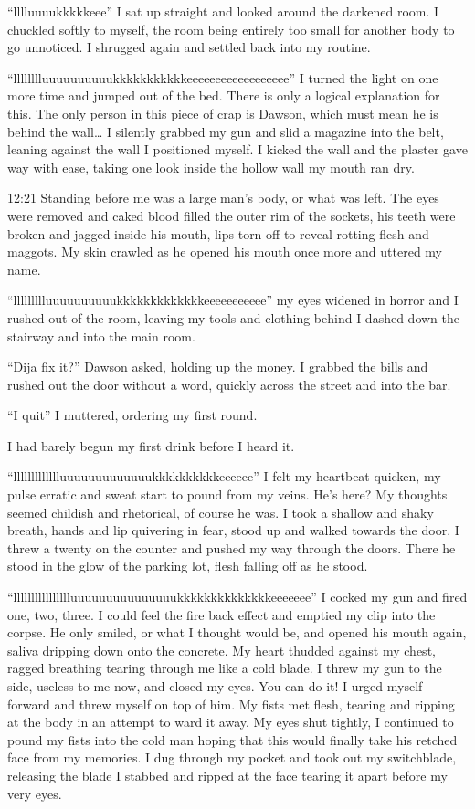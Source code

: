 ``lllluuuukkkkkeee'' I sat up straight and looked around
the darkened room. I chuckled softly to myself, the room being
entirely too small for another body to go unnoticed. I shrugged
again and settled back into my routine.

``lllllllluuuuuuuuuukkkkkkkkkkkeeeeeeeeeeeeeeeeee'' I
turned the light on one more time and jumped out of the bed. There
is only a logical explanation for this. The only person in this
piece of crap is Dawson, which must mean he is behind the wall{\ldots} I
silently grabbed my gun and slid a magazine into the belt, leaning
against the wall I positioned myself. I kicked the wall and the
plaster gave way with ease, taking one look inside the hollow wall
my mouth ran dry.

12:21 Standing before me was a large man's body, or what was left.
The eyes were removed and caked blood filled the outer rim of the
sockets, his teeth were broken and jagged inside his mouth, lips
torn off to reveal rotting flesh and maggots. My skin crawled as he
opened his mouth once more and uttered my name.

``llllllllluuuuuuuuuukkkkkkkkkkkkkeeeeeeeeeee'' my eyes
widened in horror and I rushed out of the room, leaving my tools
and clothing behind I dashed down the stairway and into the main
room.

``Dija fix it?'' Dawson asked, holding up the money. I
grabbed the bills and rushed out the door without a word, quickly
across the street and into the bar.

``I quit'' I muttered, ordering my first round.

I had barely begun my first drink before I heard it.

``llllllllllllluuuuuuuuuuuuukkkkkkkkkkeeeeee'' I felt my
heartbeat quicken, my pulse erratic and sweat start to pound from
my veins. He's here? My thoughts seemed childish and rhetorical, of
course he was. I took a shallow and shaky breath, hands and lip
quivering in fear, stood up and walked towards the door. I threw a
twenty on the counter and pushed my way through the doors. There he
stood in the glow of the parking lot, flesh falling off as he
stood.

``lllllllllllllllluuuuuuuuuuuuuuukkkkkkkkkkkkkkeeeeeee''
I cocked my gun and fired one, two, three. I could feel the fire
back effect and emptied my clip into the corpse. He only smiled, or
what I thought would be, and opened his mouth again, saliva
dripping down onto the concrete. My heart thudded against my chest,
ragged breathing tearing through me like a cold blade. I threw my
gun to the side, useless to me now, and closed my eyes. You can do
it! I urged myself forward and threw myself on top of him. My fists
met flesh, tearing and ripping at the body in an attempt to ward it
away. My eyes shut tightly, I continued to pound my fists into the
cold man hoping that this would finally take his retched face from
my memories. I dug through my pocket and took out my switchblade,
releasing the blade I stabbed and ripped at the face tearing it
apart before my very eyes.

